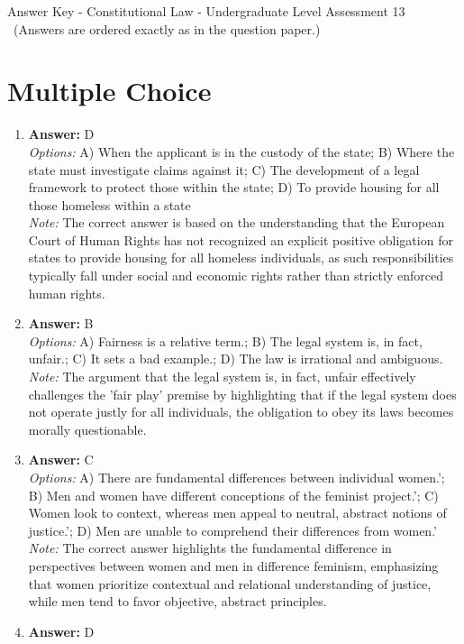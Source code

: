 \documentclass[12pt]{article}
\begin{document}
\begin{center}
Answer Key - Constitutional Law - Undergraduate Level Assessment 13 \
\small (Answers are ordered exactly as in the question paper.)
\end{center}

\section*{Multiple Choice}
\begin{enumerate}[label=\arabic*.]
\item \textbf{Answer:} D
\\ \textit{Options:} A) When the applicant is in the custody of the state; B) Where the state must investigate claims against it; C) The development of a legal framework to protect those within the state; D) To provide housing for all those homeless within a state
\\ \textit{Note:} The correct answer is based on the understanding that the European Court of Human Rights has not recognized an explicit positive obligation for states to provide housing for all homeless individuals, as such responsibilities typically fall under social and economic rights rather than strictly enforced human rights.
\item \textbf{Answer:} B
\\ \textit{Options:} A) Fairness is a relative term.; B) The legal system is, in fact, unfair.; C) It sets a bad example.; D) The law is irrational and ambiguous.
\\ \textit{Note:} The argument that the legal system is, in fact, unfair effectively challenges the 'fair play' premise by highlighting that if the legal system does not operate justly for all individuals, the obligation to obey its laws becomes morally questionable.
\item \textbf{Answer:} C
\\ \textit{Options:} A) There are fundamental differences between individual women.'; B) Men and women have different conceptions of the feminist project.'; C) Women look to context, whereas men appeal to neutral, abstract notions of justice.'; D) Men are unable to comprehend their differences from women.'
\\ \textit{Note:} The correct answer highlights the fundamental difference in perspectives between women and men in difference feminism, emphasizing that women prioritize contextual and relational understanding of justice, while men tend to favor objective, abstract principles.
\item \textbf{Answer:} D

\end{enumerate}
\end{document}
